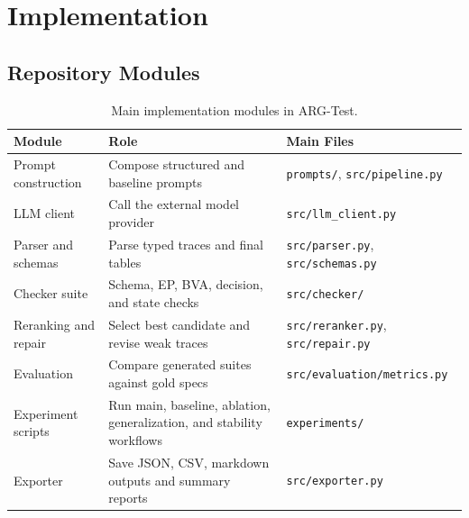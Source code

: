 \documentclass{article}
\begin{document}
\section{Implementation}

\subsection{Repository Modules}
\begin{table}[t]
\centering
\small
\begin{tabular}{p{} p{} p{}}
\toprule
\textbf{Module} & \textbf{Role} & \textbf{Main Files} \\
\midrule
Prompt construction & Compose structured and baseline prompts & \texttt{prompts/}, \texttt{src/pipeline.py} \\
LLM client & Call the external model provider & \texttt{src/llm\_client.py} \\
Parser and schemas & Parse typed traces and final tables & \texttt{src/parser.py}, \texttt{src/schemas.py} \\
Checker suite & Schema, EP, BVA, decision, and state checks & \texttt{src/checker/} \\
Reranking and repair & Select best candidate and revise weak traces & \texttt{src/reranker.py}, \texttt{src/repair.py} \\
Evaluation & Compare generated suites against gold specs & \texttt{src/evaluation/metrics.py} \\
Experiment scripts & Run main, baseline, ablation, generalization, and stability workflows & \texttt{experiments/} \\
Exporter & Save JSON, CSV, markdown outputs and summary reports & \texttt{src/exporter.py} \\
\bottomrule
\end{tabular}
\caption{Main implementation modules in ARG-Test.}
\label{tab:modules}
\end{table}
\end{document}
